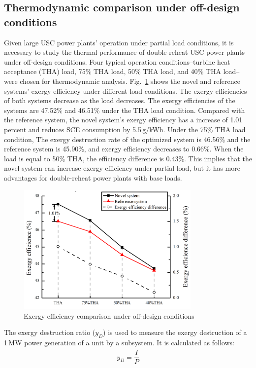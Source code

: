\documentclass[preprint,12pt]{elsarticle}
\begin{document}
\subsection{Thermodynamic comparison under off-design conditions}
\label{ssub:offdesing_compare}
Given large USC power plants' operation under partial load conditions, it is necessary to study the thermal performance of double-reheat USC power plants under off-design conditions.
Four typical operation conditions--turbine heat acceptance (THA) load, 75\% THA load, 50\% THA load, and 40\% THA load--were chosen for thermodynamic analysis. 
Fig.~\ref{fig:partload_efficiency} shows the novel and reference systems' exergy efficiency under different load conditions. The exergy efficiencies of both systems decrease as the load decreases.
The exergy efficiencies of the systems are 47.52\% and 46.51\% under the THA load condition. Compared with the reference system, the novel system's exergy efficiency has a increase of 1.01 percent and reduces SCE consumption by 5.5\,g/kWh. 
Under the 75\% THA load condition, The exergy destruction rate of the optimized system is 46.56\% and the reference system is 45.90\%, and exergy efficiency decreases to 0.66\%. 
When the load is equal to 50\% THA, the efficiency difference is 0.43\%.
This implies that the novel system can increase exergy efficiency under partial load, but it has more advantages for double-reheat power plants with base loads.

\begin{figure}[htbp]
\centering
\includegraphics[width=0.8\textwidth]{fig/partload_efficiency.png}
\caption{Exergy efficiency comparison under off-design conditions} 
\label{fig:partload_efficiency}
\end{figure}
  The exergy destruction ratio ($y_{D}$) is used to measure the exergy destruction of a 1\,MW power generation of a unit by a subsystem. It is calculated as follows:
\begin{equation}
y_{D}=\frac{\dot{I}}{P}
\end{equation}
\end{document}
